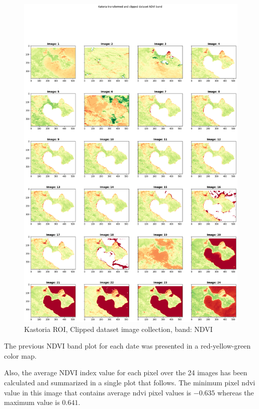 \begin{figure}[h]
    \centering
    \includegraphics[width=13cm]{figures/q2_2_ROI_clipped_ndvi_for_all_dates_images.png}
    \caption{Kastoria ROI, Clipped dataset image collection, band: NDVI}
    \label{fig:Kastoria ROI, Clipped dataset image collection, band: NDVI}
\end{figure}
\FloatBarrier %

The previous NDVI band plot for each date was presented in a red-yellow-green color map.

Also, the average NDVI index value for each pixel over the 24 images has been calculated and summarized in a single plot that follows. The minimum pixel ndvi value in this image that contains average ndvi pixel values is $-0.635$ whereas the maximum value is $0.641$. 

